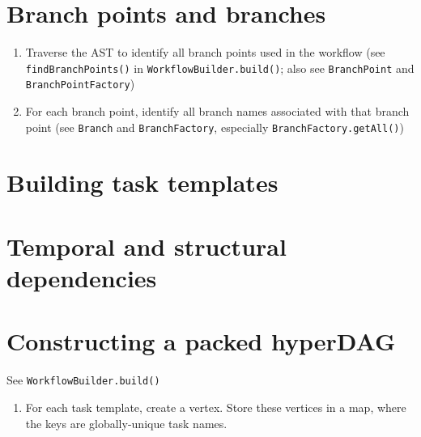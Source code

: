 \documentclass{report}
\begin{document}
\section{Branch points and branches}

\begin{enumerate}
\item Traverse the AST to identify all branch points used in the workflow (see \texttt{findBranchPoints()} in \texttt{WorkflowBuilder.build()}; also see \texttt{BranchPoint} and \texttt{BranchPointFactory})
\item For each branch point, identify all branch names associated with that branch point (see \texttt{Branch} and \texttt{BranchFactory}, especially \texttt{BranchFactory.getAll()})
\end{enumerate}

\section{Building task templates}

\section{Temporal and structural dependencies}

\section{Constructing a packed hyperDAG}

See \texttt{WorkflowBuilder.build()}

\begin{enumerate}
\item For each task template, create a vertex. Store these vertices in a map, where the keys are globally-unique task names.
\end{enumerate}
\end{document}
